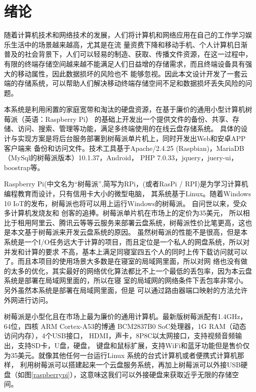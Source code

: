 \section{绪论}
\par 随着计算机技术和网络技术的发展，人们将计算机和网络应用在自己的工作学习娱乐生活中的场景越来越高，尤其是在流
量资费下降和移动手机、个人计算机日渐普及的社会背景下，人们可以轻易的制造、获取、传播文件资源，在这一过程中，
有限的终端存储空间越来越不能满足人们日益增的存储需求，而且终端设备具有强大的移动属性，因此数据损坏的风险也不
能够忽视\cite{r5,r6,r7}。因此本文设计开发了一套云端的存储系统，可以帮助人们解决移动终端存储空间不足和数据损坏丢失风险的问题。

\par 本系统是利用闲置的家庭宽带和淘汰的硬盘资源，在基于廉价的通用小型计算机树莓派（英语：Raspberry Pi）
的基础上开发出一个提供文件的备份、共享、存储、访问、搜索、管理等功能，满足多终端使用的在线云盘存储系统。
具体的设计与实现方案是将后台服务部署到树莓派单片机上，同时开发出Web和安卓APP客户端来
备份和访问文件。技术工具基于Apache/2.4.25 (Raspbian)，MariaDB（MySql的树莓派版本）10.1.37，Android，
PHP 7.0.33，jquery，juery-ui，boostrap等\cite{cloud_storage_ieee,r4}。

\par Raspberry Pi(中文名为“树莓派”,简写为RPi，(或者RasPi / RPI)是为学习计算机编程教育而设计，只有信用卡大小的微型电脑，
其系统基于Linux。随着Windows 10 IoT的发布，树莓派也将可以用上运行Windows的树莓派。 自问世以来，受众多计算机发烧友和
创客的追捧。树莓派单片机在市场上的定价为35美元，
所以相比于租用阿里云、腾讯云等等云服务来部署云盘系统，树莓派性价比笔更高，这也是本文基于树莓派来开发云盘系统的原因。
虽然树莓派的性能不是很高，但是本系统是一个I/O任务远大于计算的项目，而且定位是一个私人的网盘系统，所以对并发和计算的要求
不高，基本上满足同寝室四五个人的同时上传下载访问就可以了。而且本项目的使用场景大多数是在寝室的局域网里面，所以对网
络也没有做的太多的优化，其实最好的网络优化算法都比不上一个最低的丢包率，因为本云盘系统是部署在局域网里面的，所以在寝
室的局域网的网络条件下丢包率非常小\cite{cloud_storage_ieee,r2,r3,r8,r15,r16,r17,}。另外虽然本系统是部署在局域网里面，但是
可以通过路由器端口映射的方法允许外网进行访问。

\par 树莓派是小型化且在市场上最为廉价的通用计算机。最新版树莓派配有1.4GHz，64位，四核 ARM Cortex-A53的博通
BCM2837B0 SoC处理器，1G RAM（动态访问内存），4个USB接口， HDMI，声卡，8P8C以太网接口，支持视频音频输出，支持SD卡，U盘，硬盘，
键盘和鼠标扩展，支持WiFi和蓝牙功能但是售价仅为35美元\cite{r18}。就像其他任何一台运行Linux 系统的台式计算机或者便携式计算机那样，
利用树莓派可以搭建起来一个云盘服务系统，再加上树莓派可以外接USB硬盘（如图\ref{raspberrypi}），这意味这我们可以外接硬盘来获取近乎无限的存储空间。

